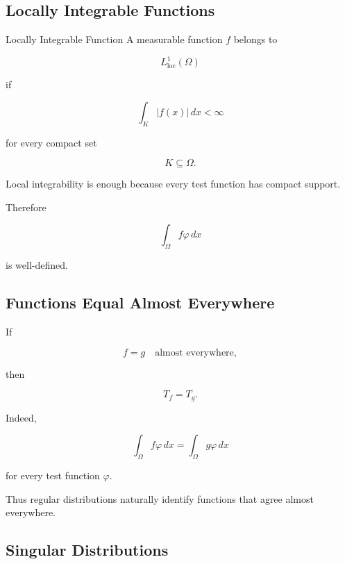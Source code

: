 \subsection{Locally Integrable Functions}
\label{subsec:locally-integrable-functions}

\begin{definitionbox}{Locally Integrable Function}
A measurable function \(f\) belongs to

\[
L_{\mathrm{loc}}^1(\Omega)
\]

if

\[
\boxed{
\int_K|f(x)|\,dx<\infty
}
\]

for every compact set

\[
K\subseteq\Omega.
\]
\end{definitionbox}

Local integrability is enough because every test function has compact
support.

Therefore

\[
\int_\Omega f\varphi\,dx
\]

is well-defined.

\subsection{Functions Equal Almost Everywhere}
\label{subsec:distributions-ae}

If

\[
f=g
\quad\text{almost everywhere},
\]

then

\[
\boxed{
T_f=T_g.
}
\]

Indeed,

\[
\int_\Omega
f\varphi\,dx
=
\int_\Omega
g\varphi\,dx
\]

for every test function \(\varphi\).

Thus regular distributions naturally identify functions that agree
almost everywhere.

\subsection{Singular Distributions}
\label{subsec:singular-distributions}

